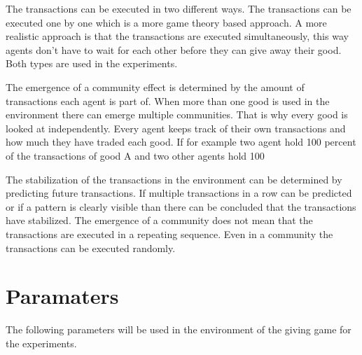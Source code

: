 \documentclass[twoside,openright]{uva-bachelor-thesis}
\begin{document}
The transactions can be executed in two different ways. The transactions can be executed one by one which is a more game theory based approach. A more realistic approach is that the transactions are executed simultaneously, this way agents don’t have to wait for each other before they can give away their good. Both types are used in the experiments.

The emergence of a community effect is determined by the amount of transactions each agent is part of. When more than one good is used in the environment there can emerge multiple communities. That is why every good is looked at independently. Every agent keeps track of their own transactions and how much they have traded each good. If for example two agent hold 100 percent of the transactions of good A and two other agents hold 100%

The stabilization of the transactions in the environment can be determined by predicting future transactions. If multiple transactions in a row can be predicted or if a pattern is clearly visible than there can be concluded that the transactions have stabilized. The emergence of a community does not mean that the transactions are executed in a repeating sequence. Even in a community the transactions can be executed randomly.


\section{Paramaters}
The following parameters will be used in the environment of the giving game for the experiments.
\end{document}
